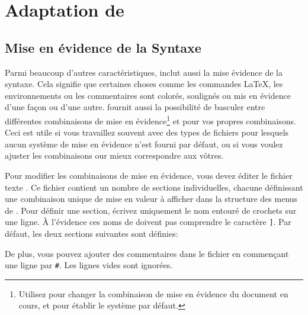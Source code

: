 
\chapter{Adaptation de \Tw}

\section{Mise en évidence de la Syntaxe}

Parmi beaucoup d'autres caractéristiques, \Tw{} inclut aussi la mise évidence de la syntaxe. Cela signifie que certaines choses comme les commandes \LaTeX, les environnements ou les commentaires sont colorés, soulignés ou mis en évidence d'une façon ou d'une autre. \Tw{} fournit aussi la possibilité de basculer entre différentes combinaisons de mise en évidence\footnote{ Utilisez \submenu{} pour changer la combinaison de mise en évidence du document en cours, et  \submenu{}\submenu{} pour établir le système par défaut.} et pour vos propres combinaisons. Ceci est utile si vous travaillez souvent avec des types de fichiers pour lesquels aucun système de mise en évidence n'est fourni par défaut, ou si vous voulez ajuster les combinaisons our mieux correspondre aux vôtres.

Pour modifier les combinaisons de mise en évidence, vous devez éditer le fichier texte . Ce fichier contient un nombre de sections individuelles, chacune définissant une combinaison unique de mise en valeur à afficher dans la structure des menus de \Tw. Pour définir une section, écrivez uniquement le nom entouré de crochets sur une ligne. À l'évidence ces noms de doivent pas comprendre le caractère \verb|]|. Par défaut, les deux sections suivantes sont définies:
\begin{verbExample}
[LaTeX]
[ConTeXt]
\end{verbExample}
De plus, vous pouvez ajouter des commentaires dans le fichier en commençant une ligne par \verb|#|. Les lignes vides sont ignorées.

